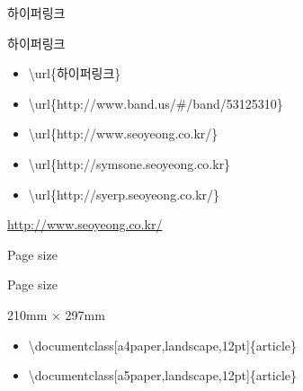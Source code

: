 \documentclass[ aspectratio=149,  10pt,blue,xcolor=pdftex,dvipsnames,table,handout,notes]{beamer}
\begin{document}

		\begin{frame}[t]{하이퍼링크}

			\begin{block} {하이퍼링크}
				\begin{itemize}
				\item [] \textbackslash  url\{하이퍼링크\}																\end{itemize}
			\end{block}

			\begin{example}
				\begin{itemize}
				\item \textbackslash url\{http://www.band.us/\#/band/53125310\} 
				\item \textbackslash url\{http://www.seoyeong.co.kr/\}
				\item \textbackslash url\{http://symsone.seoyeong.co.kr\}
				\item \textbackslash url\{http://syerp.seoyeong.co.kr/\}						
				\end{itemize}
			\end{example}

				\url{http://www.seoyeong.co.kr/}

		\note[item]{}
		\end{frame}





		\begin{frame}[c]{Page size}


			\begin{block} {Page size}
			\begin{description}[12345678901234567890]
			\item	[a4paper] 210mm $\times$ 297mm
			\item	[a5paper]
			\item	[b5paper]
			\item	[letterpaper]
			\item	[legalpaper]
			\item	[executivepaper]
			\end{description}
			\end{block}


			\begin{example}
			\begin{itemize}
			\item[]	\textbackslash documentclass[a4paper,landscape,12pt]\{article\}
			\item[]	\textbackslash documentclass[a5paper,landscape,12pt]\{article\}
			\end{itemize}
			\end{example}


		\note[item]{}
		\end{frame}
\end{document}
